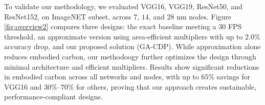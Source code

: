 To validate our methodology, we evaluated VGG16, VGG19, ResNet50, and ResNet152, on ImageNET subset, across $7$, $14$, and $28$ nm nodes. Figure \ref{fig:overview2} compares three designs: the exact baseline meeting a $30$ FPS threshold, an approximate version using area-efficient multipliers with up to $2.0\%$ accuracy drop, and our proposed solution (GA-CDP). While approximation alone reduces embodied carbon, our methodoogy further optimizes the design through minimal architecture and efficient multipliers. Results show significant reductions in embodied carbon across all networks and nodes, with up to $65\%$ savings for VGG16 and $30\%$–$70\%$ for others, proving that our approach creates sustainable, performance-compliant designs.
